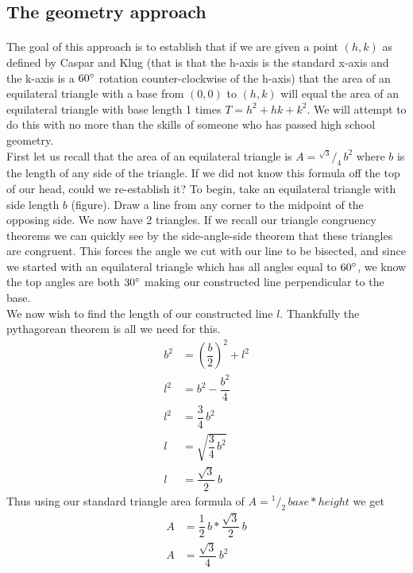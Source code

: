 \documentclass[12pt,letter]{article}
\newcommand*\rfrac[2]{{}^{#1}\!/_{#2}}
\begin{document}
\subsection{The geometry approach}

\paragraph{}
The goal of this approach is to establish that if we are given a point $(h,k)$ as defined by Caspar and Klug (that is that the h-axis is the standard x-axis and the k-axis is a $60\degree$ rotation counter-clockwise of the h-axis) that the area of an equilateral triangle with a base from $(0,0)$ to $(h,k)$ will equal the area of an equilateral triangle with base length 1 times $T = h^2 + hk + k^2$. We will attempt to do this with no more than the skills of someone who has passed high school geometry. \\

First let us recall that the area of an equilateral triangle is $A = \rfrac {\sqrt{3}} {4} \, b^2$ where $b$ is the length of any side of the triangle. If we did not know this formula off the top of our head, could we re-establish it? To begin, take an equilateral triangle with side length $b$ (figure). Draw a line from any corner to the midpoint of the opposing side. We now have 2 triangles. If we recall our triangle congruency theorems we can quickly see by the side-angle-side theorem that these triangles are congruent. This forces the angle we cut with our line to be bisected, and since we started with an equilateral triangle which has all angles equal to $60\degree$, we know the top angles are both $30\degree$ making our constructed line perpendicular to the base. \\

We now wish to find the length of our constructed line $l$. Thankfully the pythagorean theorem is all we need for this.
\begin{align*}
b^2 &= \left(\dfrac{b} {2}\right)^2 + l^2 \\
l^2 &= b^2 - \dfrac{b^2} {4} \\
l^2 &= \dfrac{3} {4} \, b^2 \\
l &= \sqrt{\dfrac{3} {4} \, b^2} \\
l &= \dfrac{\sqrt{3}} {2} \, b
\end{align*}
Thus using our standard triangle area formula of $A = \rfrac{1} {2} \, base * height$ we get
\begin{align*}
A &= \dfrac{1} {2} \, b * \dfrac{\sqrt{3}} {2} \, b \\
A &= \dfrac{\sqrt{3}} {4} \, b^2
\end{align*} \\
\end{document}
